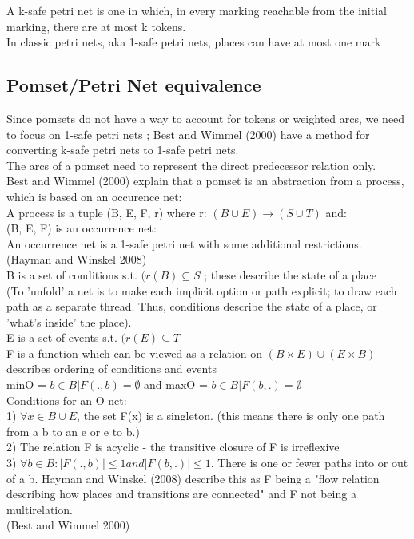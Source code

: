 A k-safe petri net is one in which, in every marking reachable from the initial marking, there are at most k tokens.\\
In classic petri nets, aka 1-safe petri nets, places can have at most one mark\\
 
\subsection{Pomset/Petri Net equivalence}
\label{subsec:pomset/petri_net_equivalence}

Since pomsets do not have a way to account for tokens or weighted arcs, we need to focus on 1-safe petri nets ; Best and Wimmel (2000) have a method for converting k-safe petri nets to 1-safe petri nets.\\

The arcs of a pomset need to represent the direct predecessor relation only.\smallskip\\

Best and Wimmel (2000) explain that a pomset is an abstraction from a process, which is based on an occurence net: \\
A process is a tuple (B, E, F, r) where r: $(B \cup E) \rightarrow (S \cup T)$ and:\\
(B, E, F) is an occurrence net:\\
An occurrence net is a 1-safe petri net with some additional restrictions. (Hayman and Winskel 2008)\\
B is a set of conditions s.t. $(r(B) \subseteq  S$ ; these describe the state of a place\\
(To 'unfold' a net is to make each implicit option or path explicit; to draw each path as a separate thread. Thus, conditions describe the state of a place, or 'what's inside' the place).\\
E is a set of events s.t. $(r(E) \subseteq  T$ \\
F is a function which can be viewed as a relation on $(B \times E) \cup (E \times B)$ - describes ordering of conditions and events\\
 minO = ${b \in B | F(., b) = \emptyset }$ and maxO = ${b \in B | F(b,.) = \emptyset }$\\
Conditions for an O-net:\\
1) $\forall x \in B \cup E$, the set F(x) is a singleton. (this means there is only one path from a b to an e or e to b.)\\
2) The relation F is acyclic - the transitive closure of F is irreflexive\\
3) $\forall b \in B: |F(. , b)| \leq 1 and |F(b, .)| \leq 1. $ There is one or fewer paths into or out of a b. Hayman and Winskel (2008) describe this as F being a "flow relation describing how places and transitions are connected" and F not being a multirelation.\\
(Best and Wimmel 2000)\\

